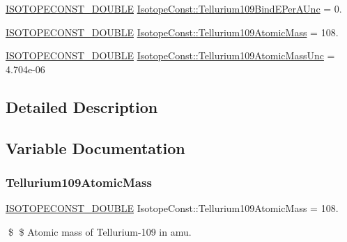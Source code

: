 \begin{DoxyCompactItemize}
\mbox{\hyperlink{group___isotope_const-_macros_ga8f45a7272ce02c0b4c65c44636ed719a}{I\+S\+O\+T\+O\+P\+E\+C\+O\+N\+S\+T\+\_\+\+D\+O\+U\+B\+LE}} \mbox{\hyperlink{group___isotope_const-_tellurium-_te109_ga6c71178b10525e47f0dbf77564bb7d0e}{Isotope\+Const\+::\+Tellurium109\+Bind\+E\+Per\+A\+Unc}} = 0.
\item 
\mbox{\hyperlink{group___isotope_const-_macros_ga8f45a7272ce02c0b4c65c44636ed719a}{I\+S\+O\+T\+O\+P\+E\+C\+O\+N\+S\+T\+\_\+\+D\+O\+U\+B\+LE}} \mbox{\hyperlink{group___isotope_const-_tellurium-_te109_ga501541a000b959df364cda2e223e8ace}{Isotope\+Const\+::\+Tellurium109\+Atomic\+Mass}} = 108.
\item 
\mbox{\hyperlink{group___isotope_const-_macros_ga8f45a7272ce02c0b4c65c44636ed719a}{I\+S\+O\+T\+O\+P\+E\+C\+O\+N\+S\+T\+\_\+\+D\+O\+U\+B\+LE}} \mbox{\hyperlink{group___isotope_const-_tellurium-_te109_ga76d1453528536ade1c141290808eaa44}{Isotope\+Const\+::\+Tellurium109\+Atomic\+Mass\+Unc}} = 4.\+704e-\/06
\end{DoxyCompactItemize}


\subsection{Detailed Description}


\subsection{Variable Documentation}
\mbox{\label{group___isotope_const-_tellurium-_te109_ga501541a000b959df364cda2e223e8ace}} 
\subsubsection{\texorpdfstring{Tellurium109\+Atomic\+Mass}{Tellurium109AtomicMass}}
{\footnotesize\ttfamily \mbox{\hyperlink{group___isotope_const-_macros_ga8f45a7272ce02c0b4c65c44636ed719a}{I\+S\+O\+T\+O\+P\+E\+C\+O\+N\+S\+T\+\_\+\+D\+O\+U\+B\+LE}} Isotope\+Const\+::\+Tellurium109\+Atomic\+Mass = 108.}

\$ \$ Atomic mass of Tellurium-\/109 in amu. \mbox{\label{group___isotope_const-_tellurium-_te109_ga76d1453528536ade1c141290808eaa44}} 

